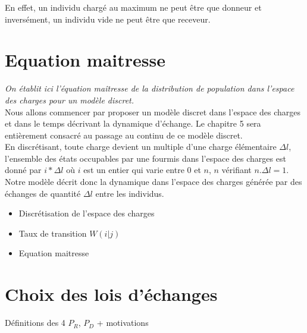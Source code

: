 En effet, un individu chargé au maximum ne peut être que donneur et inversément, un individu vide ne peut être que receveur.


\section{Equation maitresse}
\textit{On établit ici l'équation maîtresse de la distribution de population dans l'espace des charges pour un modèle discret.}\\

Nous allons commencer par proposer un modèle discret dans l'espace des charges et dans le temps décrivant la dynamique d'échange. Le chapitre 5 sera entièrement consacré au passage au continu de ce modèle discret.\\

En discrétisant, toute charge devient un multiple d'une charge élémentaire $\Delta l$, l'ensemble des états occupables par une fourmis dans l'espace des charges est donné par $i*\Delta l$ où $i$ est un entier qui varie entre $0$ et $n$, $n$ vérifiant $n.\Delta l = 1$.\\

Notre modèle décrit donc la dynamique dans l'espace des charges générée par des échanges de quantité $\Delta l$ entre les individus.

\begin{itemize}
\item Discrétisation de l'espace des charges
\item Taux de transition $W(i|j)$
\item Equation maitresse
\end{itemize}

\section{Choix des lois d'échanges}

Définitions des 4 $P_R$, $P_D$ + motivations

